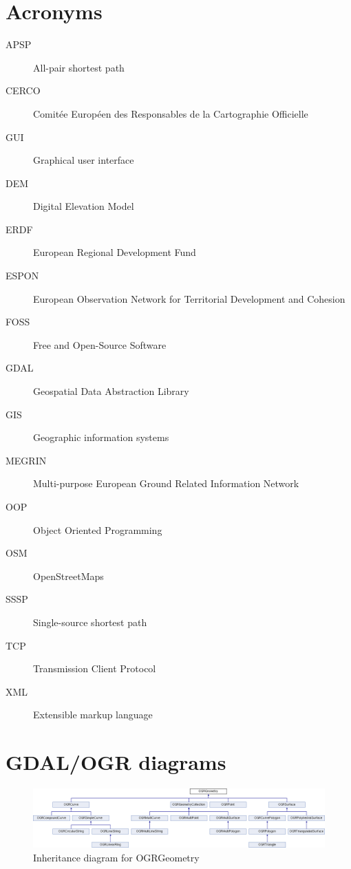 \documentclass[thesis=M,english]{FITthesis}[2012/10/20]
\begin{document}



\appendix

\chapter{Acronyms}
\begin{description}
	\item[APSP] All-pair shortest path
	\item[CERCO] Comit{\' e}e Europ{\' e}en des Responsables de la Cartographie Officielle\item[GUI] Graphical user interface
	\item[DEM] Digital Elevation Model
	\item[ERDF] European Regional Development Fund
	\item[ESPON] European Observation Network for Territorial Development and Cohesion
	\item[FOSS] Free and Open-Source Software
	\item[GDAL] Geospatial Data Abstraction Library
	\item[GIS] Geographic information systems	
	\item[MEGRIN] Multi-purpose European Ground Related Information Network
	\item[OOP] Object Oriented Programming
	\item[OSM] OpenStreetMaps
	\item[SSSP] Single-source shortest path
	\item[TCP] Transmission Client Protocol
	\item[XML] Extensible markup language
	
	
\end{description}

\chapter{GDAL/OGR diagrams}


\begin{figure}[H]
\centering
\includegraphics[width=1\textwidth]{pics/classOGRGeometry}
\caption{Inheritance diagram for OGRGeometry}
\label{pic:OGRGeo}
\end{figure}
\end{document}
